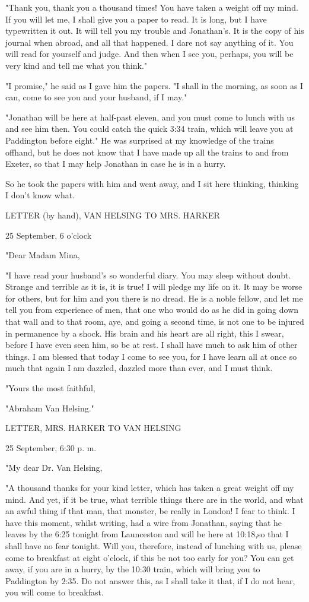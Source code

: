"Thank you, thank you a thousand times! You have taken a weight off my mind. If you will let me, I shall give you a paper to read. It is long, but I have typewritten it out. It will tell you my trouble and Jonathan's. It is the copy of his journal when abroad, and all that happened. I dare not say anything of it. You will read for yourself and judge. And then when I see you, perhaps, you will be very kind and tell me what you think." 

"I promise," he said as I gave him the papers. "I shall in the morning, as soon as I can, come to see you and your husband, if I may." 

"Jonathan will be here at half-past eleven, and you must come to lunch with us and see him then. You could catch the quick 3:34 train, which will leave you at Paddington before eight." He was surprised at my knowledge of the trains offhand, but he does not know that I have made up all the trains to and from Exeter, so that I may help Jonathan in case he is in a hurry. 

So he took the papers with him and went away, and I sit here thinking, thinking I don't know what. 

LETTER (by hand), VAN HELSING TO MRS. HARKER 

25 September, 6 o'clock 

"Dear Madam Mina, 

"I have read your husband's so wonderful diary. You may sleep without doubt. Strange and terrible as it is, it is true! I will pledge my life on it. It may be worse for others, but for him and you there is no dread. He is a noble fellow, and let me tell you from experience of men, that one who would do as he did in going down that wall and to that room, aye, and going a second time, is not one to be injured in permanence by a shock. His brain and his heart are all right, this I swear, before I have even seen him, so be at rest. I shall have much to ask him of other things. I am blessed that today I come to see you, for I have learn all at once so much that again I am dazzled, dazzled more than ever, and I must think. 

"Yours the most faithful, 

"Abraham Van Helsing." 

LETTER, MRS. HARKER TO VAN HELSING 

25 September, 6:30 p. m. 

"My dear Dr. Van Helsing, 

"A thousand thanks for your kind letter, which has taken a great weight off my mind. And yet, if it be true, what terrible things there are in the world, and what an awful thing if that man, that monster, be really in London! I fear to think. I have this moment, whilst writing, had a wire from Jonathan, saying that he leaves by the 6:25 tonight from Launceston and will be here at 10:18,so that I shall have no fear tonight. Will you, therefore, instead of lunching with us, please come to breakfast at eight o'clock, if this be not too early for you? You can get away, if you are in a hurry, by the 10:30 train, which will bring you to Paddington by 2:35. Do not answer this, as I shall take it that, if I do not hear, you will come to breakfast. 

